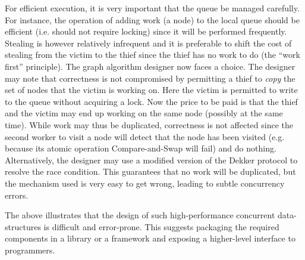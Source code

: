 For efficient execution, it is very important that the queue be
managed carefully. For instance, the operation of adding work (a node)
to the local queue should be efficient (i.e.{} should not require
locking) since it will be performed frequently. Stealing is however
relatively infrequent and it is preferable to shift the cost of
stealing from the victim to the thief since the thief has no work to
do (the ``work first'' principle). The graph algorithm designer now
faces a choice. The designer may note \cite{BC04a} that correctness is
not compromised by permitting a thief to {\em copy} the set of nodes
that the victim is working on. Here the victim is permitted to write
to the queue without acquiring a lock. Now the price to be paid is
that the thief and the victim may end up working on the same node
(possibly at the same time).  While work may thus be duplicated,
correctness is not affected since the second worker to visit a node
will detect that the node has been visited (e.g.{} because its atomic
operation Compare-and-Swap will fail) and do nothing. Alternatively,
the designer may use a modified version of the Dekker protocol
\cite{BJKLRZ95} to resolve the race condition.  This guarantees that
no work will be duplicated, but the mechanism used is very easy to get
wrong, leading to subtle concurrency errors.

The above illustrates that the design of such high-performance
concurrent data-structures is difficult and error-prone. 
This suggests packaging the required components in a library or a framework and
exposing a higher-level interface to programmers.


